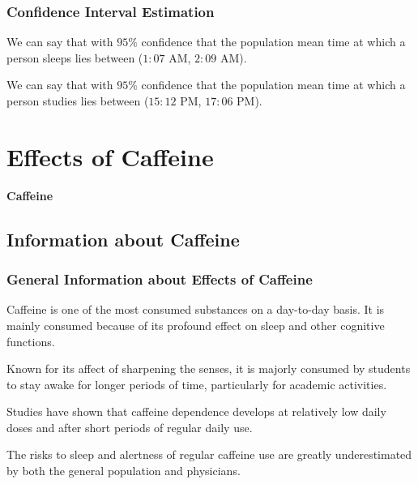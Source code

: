 \documentclass[11pt,]{beamer}
\begin{document}
\begin{frame}

    \frametitle{Confidence Interval Estimation}

    We can say that with $95 \%$ confidence that the population mean time at which a person sleeps lies between ($1:07$ AM, $2:09$ AM).
    
    \bigskip
    
    We can say that with $95 \%$ confidence that the population mean time at which a person studies lies between ($15:12$ PM, $17:06$ PM).
    
\end{frame}

\section{Effects of Caffeine}

\begin{frame}

    \begin{block}{\textbf{Caffeine}}
    \end{block}
\end{frame}

\subsection{Information about Caffeine}

\begin{frame}
	\frametitle{General Information about Effects of Caffeine}
	
	Caffeine is one of the most consumed substances on a day-to-day basis. It is mainly consumed because of its profound effect on sleep and other cognitive functions. 
	
	\bigskip
	
	Known for its affect of sharpening the senses, it is majorly consumed by students to stay awake for longer periods of time, particularly for academic activities. 

	\bigskip 
	
	Studies have shown that caffeine dependence develops at relatively low daily doses and after short periods of regular daily use.
	
	\bigskip
	
	The risks to sleep and alertness of regular caffeine use are greatly underestimated by both the general population and physicians.
\end{frame}
\end{document}
